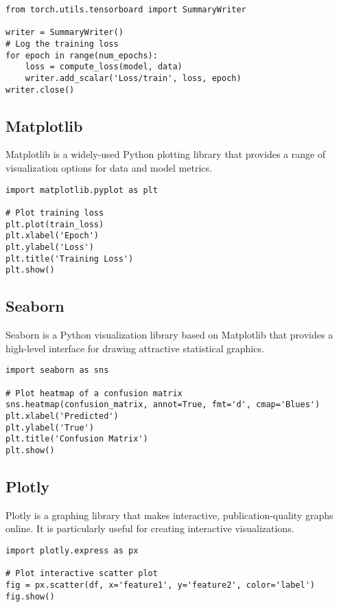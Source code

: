 \begin{verbatim}
from torch.utils.tensorboard import SummaryWriter

writer = SummaryWriter()
# Log the training loss
for epoch in range(num_epochs):
    loss = compute_loss(model, data)
    writer.add_scalar('Loss/train', loss, epoch)
writer.close()
\end{verbatim}

\subsection{Matplotlib}
Matplotlib is a widely-used Python plotting library that provides a range of visualization options for data and model metrics.

\begin{verbatim}
import matplotlib.pyplot as plt

# Plot training loss
plt.plot(train_loss)
plt.xlabel('Epoch')
plt.ylabel('Loss')
plt.title('Training Loss')
plt.show()
\end{verbatim}

\subsection{Seaborn}
Seaborn is a Python visualization library based on Matplotlib that provides a high-level interface for drawing attractive statistical graphics.

\begin{verbatim}
import seaborn as sns

# Plot heatmap of a confusion matrix
sns.heatmap(confusion_matrix, annot=True, fmt='d', cmap='Blues')
plt.xlabel('Predicted')
plt.ylabel('True')
plt.title('Confusion Matrix')
plt.show()
\end{verbatim}

\subsection{Plotly}
Plotly is a graphing library that makes interactive, publication-quality graphs online. It is particularly useful for creating interactive visualizations.

\begin{verbatim}
import plotly.express as px

# Plot interactive scatter plot
fig = px.scatter(df, x='feature1', y='feature2', color='label')
fig.show()
\end{verbatim}

